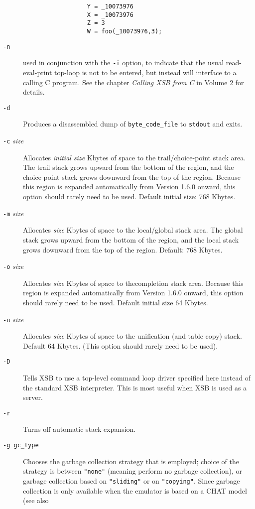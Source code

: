 \begin{description}
\begin{verbatim}
                  Y = _10073976
                  X = _10073976
                  Z = 3
                  W = foo(_10073976,3);
	\end{verbatim}
\item[{\tt -n}] used in conjunction with the {\tt -i} option, to
    indicate that the usual read-eval-print top-loop is not to be
    entered, but instead will interface to a calling C program.  See
    the chapter {\it Calling XSB from C} in Volume 2  for details.
\item[{\tt -d}] Produces a disassembled dump of {\tt byte\_code\_file} to 
    {\tt stdout} and exits.
\item[{\tt -c} {\em size}] Allocates {\em initial  size\/} Kbytes of space
    to the trail/choice-point stack area.  The trail stack grows
    upward from the bottom of the region, and the choice point stack
    grows downward from the top of the region.  Because this region is
    expanded automatically from Version 1.6.0 onward, this option
    should rarely need to be used.  Default initial size: 768 Kbytes.
\item[{\tt -m} {\em size}] Allocates {\em size\/} Kbytes
    of space to the local/global stack area.  The global stack grows 
    upward from the bottom of the region, and the local stack grows 
    downward from the top of the region.  Default: 768 Kbytes.
\item[{\tt -o} {\em size}] Allocates {\em size\/} Kbytes of space
    to thecompletion stack area.  Because this region is expanded
    automatically from Version 1.6.0 onward, this option should rarely
    need to be used. Default initial size 64 Kbytes.
\item[{\tt -u} {\em size}] Allocates {\em size} Kbytes of space
    to the unification (and table copy) stack.  Default 64 Kbytes.
    (This option should rarely need to be used).
\item[{\tt -D}] Tells XSB to use a top-level command loop driver specified
  here instead of the standard XSB interpreter. This is most useful when
  XSB is used as a server.
\item[{\tt -r}] Turns off automatic stack expansion.
\item[{\tt -g gc\_type}] Chooses the garbage collection strategy that
    is employed; choice of the strategy is between {\tt "none"} (meaning
    perform no garbage collection), or garbage collection based on
    {\tt "sliding"} or on {\tt "copying"}.  Since garbage collection is
    only available when the emulator is based on a CHAT model (see also

\end{description}
